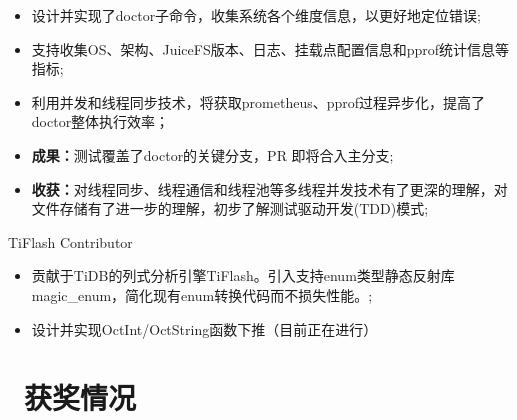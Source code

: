\documentclass{resume}
\begin{document}
\begin{onehalfspacing}
\begin{itemize}
    \item 设计并实现了doctor子命令，收集系统各个维度信息，以更好地定位错误;
    \item 支持收集OS、架构、JuiceFS版本、日志、挂载点配置信息和pprof统计信息等指标;
    \item 利用并发和线程同步技术，将获取prometheus、pprof过程异步化，提高了doctor整体执行效率；
    \item \textbf{成果：}测试覆盖了doctor的关键分支，PR 即将合入主分支;
    \item \textbf{收获：}对线程同步、线程通信和线程池等多线程并发技术有了更深的理解，对文件存储有了进一步的理解，初步了解测试驱动开发(TDD)模式;
\end{itemize}
\end{onehalfspacing}


TiFlash Contributor
\begin{itemize}
    \item 贡献于TiDB的列式分析引擎TiFlash。引入支持enum类型静态反射库magic\_enum，简化现有enum转换代码而不损失性能。;
    \item 设计并实现OctInt/OctString函数下推（目前正在进行）
\end{itemize}

\section{\faHeartO\ 获奖情况}



\end{document}
